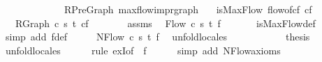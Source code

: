 \begin{isabellebody}
\ \ \isanewline
%
\endisadelimproof
\ \ \ \ \ \ \isanewline
{}\isamarkupfalse%
\ %
\isanewline
\isanewline
{}\isamarkupfalse%
\ {\isacharparenleft}\ RPreGraph{\isacharparenright}\ maxflow{\isacharunderscore}imp{\isacharunderscore}rgraph{\isacharcolon}\isanewline
\ \ \ {\isachardoublequoteopen}isMaxFlow\ {\isacharparenleft}flow{\isacharunderscore}of{\isacharunderscore}cf\ cf{\isacharparenright}{\isachardoublequoteclose}\isanewline
\ \ \ {\isachardoublequoteopen}RGraph\ c\ s\ t\ cf{\isachardoublequoteclose}\isanewline
%
\isadelimproof
%
\endisadelimproof
%
\isatagproof
{}\isamarkupfalse%
\ {\isacharminus}\ \ \isanewline
\ \ \isamarkupfalse%
\ assms\ \isamarkupfalse%
\ Flow\ c\ s\ t\ f\ \isanewline
\ \ \ \ \isamarkupfalse%
\ isMaxFlow{\isacharunderscore}def\ \isamarkupfalse%
\ {\isacharparenleft}simp\ add{\isacharcolon}\ f{\isacharunderscore}def{\isacharparenright}\isanewline
\ \isanewline
\ \ \isamarkupfalse%
\ NFlow\ c\ s\ t\ f\ \isamarkupfalse%
\ unfold{\isacharunderscore}locales\ \ \ \ \ \isanewline
\ \ \isanewline
\ \ \isamarkupfalse%
\ {\isacharquery}thesis\ \ \ \ \isanewline
\ \ \ \ \isamarkupfalse%
\ unfold{\isacharunderscore}locales\isanewline
\ \ \ \ \isamarkupfalse%
\ {\isacharparenleft}rule\ exI{\isacharbrackleft}of\ {\isacharunderscore}\ f{\isacharbrackright}{\isacharparenright}\isanewline
\ \ \ \ \isamarkupfalse%
\ {\isacharparenleft}simp\ add{\isacharcolon}\ NFlow{\isacharunderscore}axioms{\isacharparenright}\ \ \isanewline
\ \ \ \ \isamarkupfalse%
\ \ \isanewline
{}\isamarkupfalse%
%
\endisatagproof
{\isafoldproof}%
%
\isadelimproof
\ \ \ \ \ \ \isanewline
%
\endisadelimproof
%
\isadelimtheory
\ \ \isanewline
%
\endisadelimtheory
%
\isatagtheory
{}\isamarkupfalse%
\ %
%
\endisatagtheory
{\isafoldtheory}%
%
\isadelimtheory
%
\endisadelimtheory
%
\end{isabellebody}%

